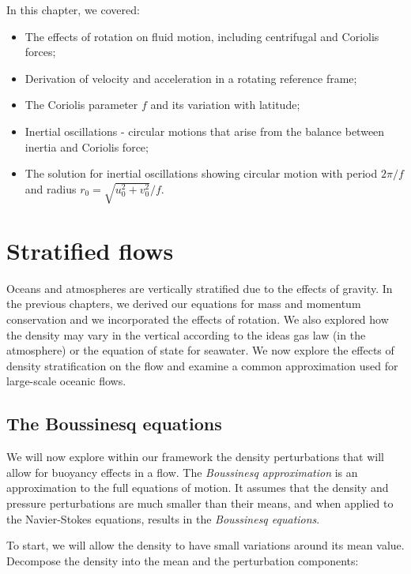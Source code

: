 \documentclass[12pt]{article}
\numberwithin{equation}{section}
\numberwithin{figure}{section}
\numberwithin{table}{section}
\begin{document}
In this chapter, we covered:

\begin{itemize}
  \item The effects of rotation on fluid motion, including centrifugal and Coriolis
  forces;
  \item Derivation of velocity and acceleration in a rotating reference frame;
  \item The Coriolis parameter $f$ and its variation with latitude;
  \item Inertial oscillations - circular motions that arise from the balance between
  inertia and Coriolis force;
  \item The solution for inertial oscillations showing circular motion with period
  $2\pi/f$ and radius $r_0 = \sqrt{u_0^2 + v_0^2}/f$.
\end{itemize}

\newpage
\section{Stratified flows}

Oceans and atmospheres are vertically stratified due to the effects of gravity.
In the previous chapters, we derived our equations for mass and momentum
conservation and we incorporated the effects of rotation.
We also explored how the density may vary in the vertical according to the
ideas gas law (in the atmosphere) or the equation of state for seawater.
We now explore the effects of density stratification on the flow and examine a
common approximation used for large-scale oceanic flows.

\subsection{The Boussinesq equations}

We will now explore within our framework the density perturbations that will
allow for buoyancy effects in a flow.
The \textit{Boussinesq approximation} is an
approximation to the full equations of motion.
It assumes that the density and pressure perturbations are much smaller than
their means, and when applied to the Navier-Stokes equations, results in the
\textit{Boussinesq equations}.

To start, we will allow the density to have small variations around its mean
value.
Decompose the density into the mean and the perturbation components:
\end{document}
